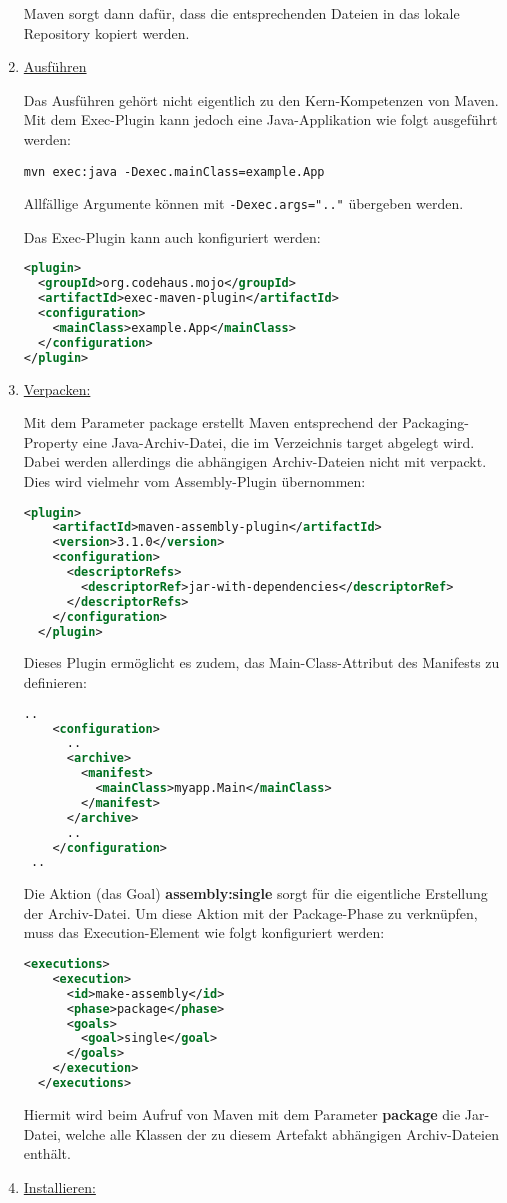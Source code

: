\begin{enumerate}
Maven sorgt dann dafür, dass die entsprechenden Dateien in das lokale
Repository kopiert werden.
%
\newslide
\item \underline{Ausführen}

Das Ausführen gehört nicht eigentlich zu den Kern-Kompetenzen von
Maven. Mit dem Exec-Plugin kann jedoch eine Java-Applikation  wie
folgt ausgeführt werden:
\begin{lstlisting}
mvn exec:java -Dexec.mainClass=example.App
\end{lstlisting}
Allfällige Argumente können mit \verb+-Dexec.args=".."+ übergeben
werden.

Das Exec-Plugin kann auch konfiguriert werden:
\begin{lstlisting}[language=xml,
  morekeywords={plugin,groupId,artifactId,configuration,mainClass}]
<plugin>
  <groupId>org.codehaus.mojo</groupId>
  <artifactId>exec-maven-plugin</artifactId>
  <configuration>
    <mainClass>example.App</mainClass>
  </configuration>
</plugin>
\end{lstlisting}
\newslide
\item \underline{Verpacken:}

Mit dem Parameter package erstellt Maven entsprechend der
Packaging-Property eine Java-Archiv-Datei, die im Verzeichnis
target abgelegt wird. Dabei werden allerdings die abhängigen
Archiv-Dateien nicht mit verpackt. Dies wird vielmehr vom Assembly-Plugin
übernommen:
\begin{lstlisting}[language=xml,
  morekeywords={plugin,artifactId,configuration,descriptorRefs,
  descriptorRef}]
  <plugin>
    <artifactId>maven-assembly-plugin</artifactId>
    <version>3.1.0</version>
    <configuration>
      <descriptorRefs>
        <descriptorRef>jar-with-dependencies</descriptorRef>
      </descriptorRefs>
    </configuration>
  </plugin>
\end{lstlisting}
\newslide
Dieses Plugin ermöglicht es zudem, das Main-Class-Attribut
des Manifests zu definieren:
\begin{lstlisting}[language=xml,
morekeywords={configuration,archive,manifest,mainClass}]
..
    <configuration>
      ..
      <archive>
        <manifest>
          <mainClass>myapp.Main</mainClass>
        </manifest>
      </archive>
      ..
    </configuration>
 ..
\end{lstlisting}
Die Aktion (das Goal) {\bfseries assembly:single} sorgt
für die eigentliche Erstellung der Archiv-Datei.
Um diese Aktion
 mit der Package-Phase zu verknüpfen, muss das
Execution-Element wie folgt konfiguriert werden:
\begin{lstlisting}[language=xml,
  morekeywords={executions,execution,id,phase,goals,goal}]
  <executions>
    <execution>
      <id>make-assembly</id>
      <phase>package</phase>
      <goals>
        <goal>single</goal>
      </goals>
    </execution>
  </executions>
\end{lstlisting}
Hiermit wird beim Aufruf von Maven mit dem Parameter {\bfseries package} die
Jar-Datei, welche alle Klassen der zu diesem Artefakt abhängigen
Archiv-Dateien enthält.
%
\newslide
\item \underline{Installieren:}


\end{enumerate}
